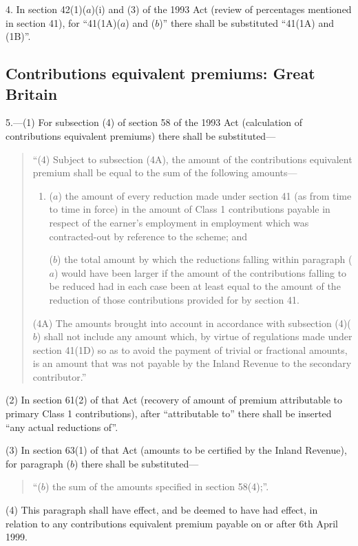 \documentclass[12pt,a4paper]{article}
\begin{document}
4. In section 42(1)($a$)(i)  and (3)  of the 1993 Act (review of percentages mentioned in section 41), for “41(1A)($a$)  and ($b$)” there shall be substituted “41(1A)  and (1B)”.

\subsection*{Contributions equivalent premiums: Great Britain}

5.---(1) For subsection (4)  of section 58 of the 1993 Act (calculation of contributions equivalent premiums) there shall be substituted—
\begin{quotation}
“(4) Subject to subsection (4A), the amount of the contributions equivalent premium shall be equal to the sum of the following amounts—
\begin{enumerate}\item[]
($a$) the amount of every reduction made under section 41 (as from time to time in force) in the amount of Class 1 contributions payable in respect of the earner’s employment in employment which was contracted-out by reference to the scheme; and

($b$) the total amount by which the reductions falling within paragraph ($a$)  would have been larger if the amount of the contributions falling to be reduced had in each case been at least equal to the amount of the reduction of those contributions provided for by section 41. 
\end{enumerate}

(4A) The amounts brought into account in accordance with subsection (4)($b$)  shall not include any amount which, by virtue of regulations made under section 41(1D) so as to avoid the payment of trivial or fractional amounts, is an amount that was not payable by the Inland Revenue to the secondary contributor.”
\end{quotation}

(2) In section 61(2)  of that Act (recovery of amount of premium attributable to primary Class 1 contributions), after “attributable to” there shall be inserted “any actual reductions of”.

(3) In section 63(1)  of that Act (amounts to be certified by the Inland Revenue), for paragraph ($b$)  there shall be substituted—
\begin{quotation}
“($b$) the sum of the amounts specified in section 58(4);”.
\end{quotation}

(4) This paragraph shall have effect, and be deemed to have had effect, in relation to any contributions equivalent premium payable on or after 6th April 1999. 
\end{document}
